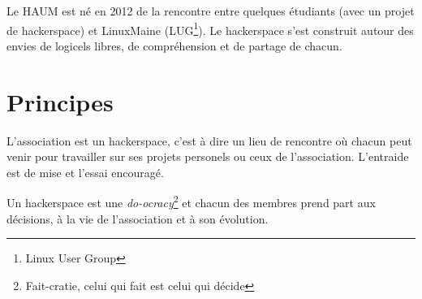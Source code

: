 Le HAUM est né en 2012 de la rencontre entre quelques étudiants (avec un projet de hackerspace) et LinuxMaine
(LUG\footnote{Linux User Group}). Le hackerspace s'est construit autour des envies de logicels libres, de compréhension
et de partage de chacun.

\section{Principes}

L'association est un hackerspace, c'est à dire un lieu de rencontre où chacun peut venir pour travailler sur ses projets
personels ou ceux de l'association. L'entraide est de mise et l'essai encouragé.

Un hackerspace est une \textit{do-ocracy}\footnote{Fait-cratie, celui qui fait est celui qui décide} et chacun des
membres prend part aux décisions, à la vie de l'association et à son évolution.

